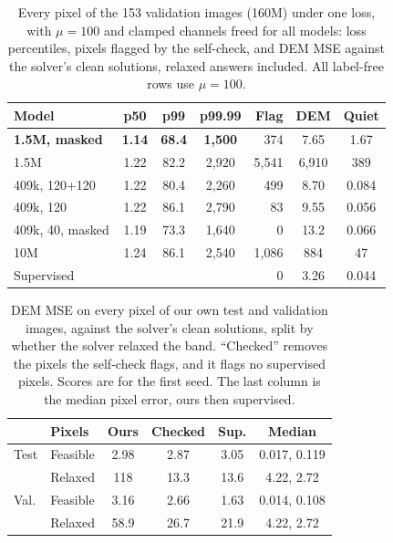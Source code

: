 \begin{table}[t]
\centering
\small
\caption{Every pixel of the 153 validation images (160M) under one loss, with $\mu=100$ and clamped channels freed for all models: loss percentiles, pixels flagged by the self-check, and DEM MSE against the solver's clean solutions, relaxed answers included. All label-free rows use $\mu=100$.}
\label{tab:fullval}
\setlength{\tabcolsep}{3.6pt}
\begin{tabular}{@{}lcccrcc@{}}
\toprule
Model & p50 & p99 & p99.99 & Flag & DEM & Quiet\\
\midrule
\textbf{1.5M, masked} & \textbf{1.14} & \textbf{68.4} & \textbf{1,500} & 374 & 7.65 & 1.67\\
1.5M & 1.22 & 82.2 & 2,920 & 5,541 & 6,910 & 389\\
409k, 120+120 & 1.22 & 80.4 & 2,260 & 499 & 8.70 & 0.084\\
409k, 120 & 1.22 & 86.1 & 2,790 & 83 & 9.55 & 0.056\\
409k, 40, masked & 1.19 & 73.3 & 1,640 & 0 & 13.2 & 0.066\\
10M & 1.24 & 86.1 & 2,540 & 1,086 & 884 & 47\\
Supervised & & & & 0 & 3.26 & 0.044\\
\bottomrule
\end{tabular}
\end{table}

\begin{table}[t]
\centering
\small
\caption{DEM MSE on every pixel of our own test and validation images, against the solver's clean solutions, split by whether the solver relaxed the band. ``Checked'' removes the pixels the self-check flags, and it flags no supervised pixels. Scores are for the first seed. The last column is the median pixel error, ours then supervised.}
\label{tab:allpixels}
\setlength{\tabcolsep}{4pt}
\begin{tabular}{@{}llcccc@{}}
\toprule
 & Pixels & Ours & Checked & Sup. & Median\\
\midrule
Test & Feasible & 2.98 & 2.87 & 3.05 & 0.017, 0.119\\
 & Relaxed & 118 & 13.3 & 13.6 & 4.22, 2.72\\
\midrule
Val. & Feasible & 3.16 & 2.66 & 1.63 & 0.014, 0.108\\
 & Relaxed & 58.9 & 26.7 & 21.9 & 4.22, 2.72\\
\bottomrule
\end{tabular}
\end{table}

